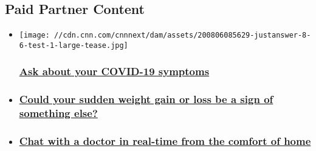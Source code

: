 \hypertarget{paid-partner-content-}{%
\subsection{Paid Partner Content~}\label{paid-partner-content-}}

\begin{itemize}
\item
  \href{https://justanswer.9pctbx.net/c/2200381/864061/9320}{}

  \texttt{[image: //cdn.cnn.com/cnnnext/dam/assets/200806085629-justanswer-8-6-test-1-large-tease.jpg]}

  \hypertarget{ask-about-your-covid-19-symptoms}{%
  \subsubsection{\texorpdfstring{\href{https://justanswer.9pctbx.net/c/2200381/864061/9320}{Ask
  about your COVID-19
  symptoms}}{Ask about your COVID-19 symptoms}}\label{ask-about-your-covid-19-symptoms}}
\item
  \hypertarget{could-your-sudden-weight-gain-or-loss-be-a-sign-of-something-else}{%
  \subsubsection{\texorpdfstring{\href{https://justanswer.9pctbx.net/c/2200381/864062/9320}{Could
  your sudden weight gain or loss be a sign of something
  else?}}{Could your sudden weight gain or loss be a sign of something else?}}\label{could-your-sudden-weight-gain-or-loss-be-a-sign-of-something-else}}
\item
  \hypertarget{chat-with-a-doctor-in-real-time-from-the-comfort-of-home}{%
  \subsubsection{\texorpdfstring{\href{https://justanswer.9pctbx.net/c/2200381/864063/9320}{Chat
  with a doctor in real-time from the comfort of
  home}}{Chat with a doctor in real-time from the comfort of home}}\label{chat-with-a-doctor-in-real-time-from-the-comfort-of-home}}
\end{itemize}

